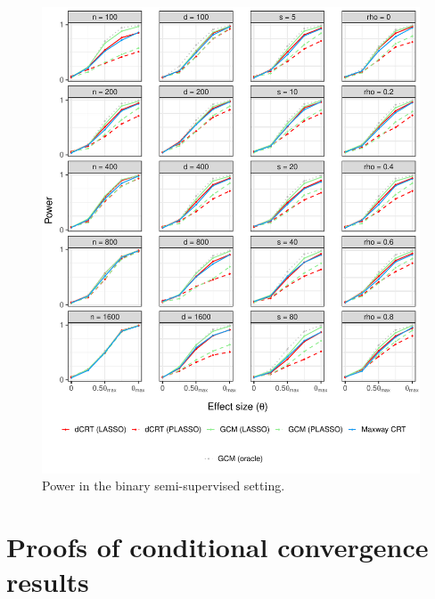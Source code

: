 \documentclass[aos]{imsart}
\theoremstyle{definition}
\theoremstyle{remark}
\begin{document}
\begin{figure}[!ht]
	\centering
	\includegraphics[width = \textwidth]{figures/binomial_semi_supervised_setting_alternative.pdf}
	\caption{Power in the binary semi-supervised setting.}
	\label{fig:binomial_semi-supervised_alternative}
\end{figure}



\clearpage

\section{Proofs of conditional convergence results} \label{sec:conditional-convergence-proofs}
\end{document}
